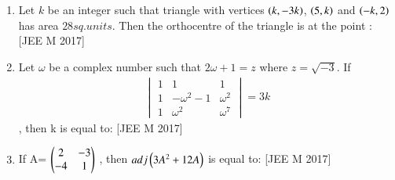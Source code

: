 \documentclass[journal,,12pt,twocolumn]{IEEEtran}
\theoremstyle{remark}
\begin{document}
\begin{enumerate}
    \item Let $k$ be an integer such that triangle with vertices $\left(k,-3k\right)$, $\left(5,k\right)$ and $\left(-k,2\right)$ has area $28 sq. units$. Then the orthocentre of the triangle is at the point :
    \hfill{[JEE M 2017]}
    \begin{enumerate}
    \end{enumerate}
    \item Let $\omega$ be a complex number such that $2\omega + 1=z$ where $z=\sqrt{-3}$. If \begin{align}\begin{vmatrix}
1 & 1  & 1 \\
1 & -\omega^2-1 & \omega^2 \\
1 & \omega^2 & \omega^7 
\end{vmatrix}=3k \end{align}, then k is equal to:
\hfill{[JEE M 2017]}
\begin{enumerate}
\end{enumerate}
\item If A= $\begin{pmatrix}
    2 & -3 \\
    -4 & 1
\end{pmatrix}$
    , then $adj\left(3A^2+12A\right)$ is equal to:
\hfill{[JEE M 2017]}
\begin{enumerate}
\end{enumerate}
\end{enumerate}
\end{document}
